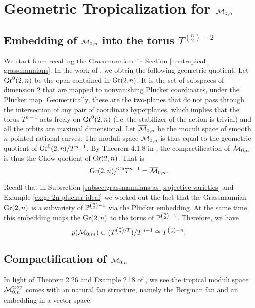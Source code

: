 \section{Geometric Tropicalization for $\overline{\calm_{0, n}}$}
\label{sec:geometric-tropicalization-for-m-0n}
    \subsection{Embedding of $\calm_{0,n}$ into the torus $T^{\binom{n}{2} - 2}$}
    \label{subsec:embedding-m-0n-into-torus}
        We start from recalling the Grassmannians in Section \ref{sec:tropical-grassmannians}.
        In the work of \citet{Maclagan2010}, we obtain the following geometric quotient:
        Let $\gr^0(2, n)$ be the open contained in $\gr(2, n)$.
        It is the set of subspaces of dimension $2$ that are mapped to nonvanishing Pl\"{u}cker coordinates,
        under the Pl\"{u}cker map.
        Geometrically, these are the two-planes that do not pass through the intersection of any pair of coordinate hyperplanes,
        which implies that the torus $T^{n-1}$ 
        acts freely on $\gr^0(2, n)$ 
        (i.e. the stabilizer of the action is trivial)
        and all the orbits are maximal dimensional.
        Let $\overline{\calm}_{0, n}$ 
        be the moduli space of smooth $n$-pointed rational curves.
        The moduli space $\calm_{0, n}$ 
        is thus equal to the geometric quotient     of $\gr^0(2, n)/ T^{n-1}$.
        By Theorem 4.1.8 in \citet{Kapranov1993}, the compactification of $\calm_{0, n}$ is thus the Chow quotient of $\gr(2, n)$.
        That is 
        \[
        \gr(2, n) /^\text{Ch}T^{n-1} = \overline{\calm}_{0, n}. 
        \]
    
        Recall that in Subsection \ref{subsec:grassmannians-as-projective-varieties} and Example \ref{ex:gr-2n-plucker-ideal}
        we worked out the fact that 
        the Grassmannian $\gr(2, n)$ is a     subvariety of $\P^{\binom{n}{2} - 1}$ 
        via the Pl\"{u}cker embedding.
        At the same time, 
        this embedding maps the $\gr(2, n)$ 
        to the torus of $\P^{\binom{n}{2} - 1}$.
        Therefore, we have 
        \[
        p(\calm_{0, m}) \subset (T^{\binom{n}{2} / T})/T^{n-1} \cong T^{\binom{n}{2} - n}.
        \]
        
    \subsection{Compactification of $\calm_{0, n}$}
    \label{subsec:compactification-m-0n}
        In light of Theorem 2.26 and 
        Example 2.18 of \citet{Cavalieri2014},
        we see the tropical moduli space $\calm_{0, n}^{\trop}$ 
        comes with an natural fan structure, namely the Bergman fan and an embedding in a vector space.
        
